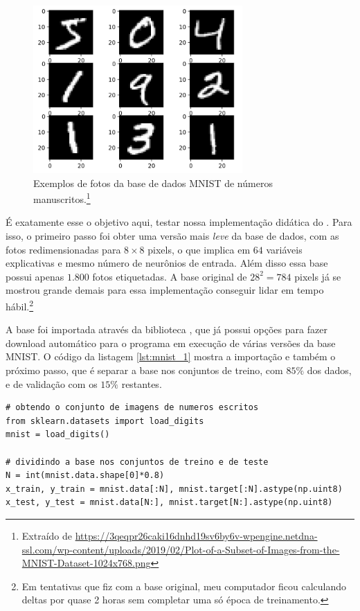 \begin{figure}[htb]
\centering
\includegraphics[width=8cm]{figuras/mnist}
\caption{Exemplos de fotos da base de dados MNIST de números manuscritos.\footnote{Extraído de \url{https://3qeqpr26caki16dnhd19sv6by6v-wpengine.netdna-ssl.com/wp-content/uploads/2019/02/Plot-of-a-Subset-of-Images-from-the-MNIST-Dataset-1024x768.png}}}
\label{fig:mnist_fig}
\end{figure}

É exatamente esse o objetivo aqui, testar nossa implementação didática do . Para isso, o primeiro passo foi obter uma versão mais \emph{leve} da base de dados, com as fotos redimensionadas para $8 \times 8$ pixels, o que implica em $64$ variáveis explicativas e mesmo número de neurônios de entrada. Além disso essa base possui apenas $1.800$ fotos etiquetadas. A base original de $28^2 = 784$ pixels já se mostrou grande demais para essa implementação conseguir lidar em tempo hábil.\footnote{Em tentativas que fiz com a base original, meu computador ficou calculando deltas por quase 2 horas sem completar uma só época de treinamento.}

A base foi importada através da biblioteca , que já possui opções para fazer download automático para o programa em execução de várias versões da base MNIST. O código da listagem \ref{lst:mnist_1} mostra a importação e também o próximo passo, que é separar a base nos conjuntos de treino, com $85\%$ dos dados, e de validação com os $15\%$ restantes.

\begin{scriptsize}
\estiloR
\begin{lstlisting}[caption={Trecho do script \eng{mnist\_test.py}}, label={lst:mnist_1}, escapeinside={\%}]
# obtendo o conjunto de imagens de numeros escritos
from sklearn.datasets import load_digits
mnist = load_digits()

# dividindo a base nos conjuntos de treino e de teste
N = int(mnist.data.shape[0]*0.8)
x_train, y_train = mnist.data[:N], mnist.target[:N].astype(np.uint8)
x_test, y_test = mnist.data[N:], mnist.target[N:].astype(np.uint8)
\end{lstlisting}
\end{scriptsize}

